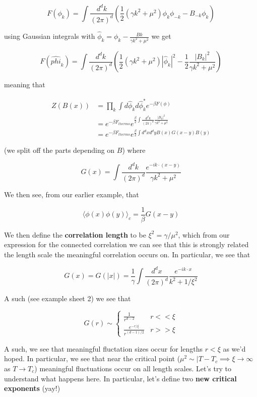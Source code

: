 \documentclass{article}
\theoremstyle{definition}
\begin{document}
$$ F(\phi_k) = \int \frac{d^d k}{(2\pi)^d} \left( \frac{1}{2}(\gamma k^2 +
  \mu^2) \phi_k \phi_{-k} - B_{-k} \phi_k \right) $$

using Gaussian integrals with $\hat{\phi}_k = \phi_k - \frac{Bk}{\gamma k^2 +
  \mu^2}$ we get

$$ F(\hat{phi}_k) = \int \frac{d^d k}{(2\pi)^d} \left( \frac{1}{2} (\gamma k^2 +
  \mu^2) |\hat{\phi}_k |^2 - \frac{1}{2} \frac{|B_k|^2}{\gamma k^2 + \mu^2}
\right) $$

meaning that

\begin{align*}
  Z(B(x)) &= \prod_k \int d \hat{\phi}_k d \hat{\phi}_k^* e^{-\beta F(\phi)} \\
          &= e^{-\beta F_{thermo}} e^{\frac{\beta}{2} \int \frac{d^d k}{(2\pi)^d} \frac{|B_k|^2}{\gamma k^2 + \mu^2}} \\
          &= e^{-\beta F_{thermo}} e^{\frac{\beta}{2} \int d^d x d^d y B(x) G(x - y) B(y)}
\end{align*}

(we split off the parts depending on $B$) where

$$ G(x) = \int \frac{d^d k}{(2 \pi)^d} \frac{e^{-ik \cdot (x - y)}}{\gamma k^2 +
  \mu^2} $$

We then see, from our earlier example, that

$$ \langle \phi(x) \phi(y) \rangle_c = \frac{1}{\beta} G(x - y) $$

We then define the \textbf{correlation length} to be $\xi^2 = \gamma / \mu^2$,
which from our expression for the connected correlation we can see that this is
strongly related the length scale the meaningful correlation occurs on. In
particular, we see that

$$ G(x) = G(|x|) = \frac{1}{\gamma} \int \frac{d^d x}{(2\pi)^d} \frac{e^{-i k
    \cdot x}}{k^2 + 1 / \xi^2} $$

A such (see example sheet 2) we see that

$$ G(r) \sim
\begin{cases}
  \frac{1}{r^{d - 2}} & r << \xi \\
  \frac{e^{-r / \xi}}{r^{(d - 1) / 2}} & r >> \xi
\end{cases}
$$

A such, we see that meaningful fluctation sizes occur for lengths $ r < \xi$ as
we'd hoped. In particular, we see that near the critical point ($\mu^2 \sim |T -
T_c \implies \xi \to \infty$ as $T \to T_c$) meaningful fluctuations occur on
all length scales. Let's try to understand what happens here. In particular,
let's define two \textbf{new critical exponents} (yay!)
\end{document}
